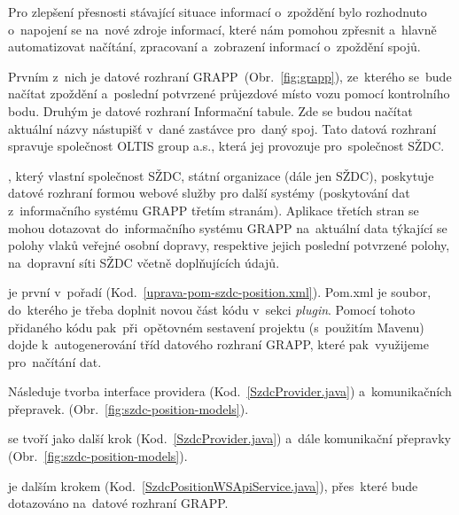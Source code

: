 
Pro zlepšení přesnosti stávající situace informací o~zpoždění bylo rozhodnuto o~napojení se na~nové zdroje informací, které nám pomohou zpřesnit a~hlavně automatizovat načítání, zpracovaní a~zobrazení informací o~zpoždění spojů.

Prvním z~nich je datové rozhraní GRAPP~(Obr.~\ref{fig:grapp}), ze~kterého se~bude načítat zpoždění a~poslední potvrzené průjezdové místo vozu pomocí kontrolního bodu. Druhým je datové rozhraní Informační tabule. Zde se budou načítat aktuální názvy nástupišť v~dané zastávce pro~daný spoj. Tato datová rozhraní spravuje společnost OLTIS group a.s., která jej provozuje pro~společnost SŽDC.



, který vlastní společnost SŽDC, státní organizace (dále jen SŽDC), poskytuje datové rozhraní formou webové služby pro další systémy (poskytování dat z~informačního systému GRAPP třetím stranám). Aplikace třetích stran se mohou dotazovat do~informačního systému GRAPP na~aktuální data týkající se polohy vlaků veřejné osobní dopravy, respektive jejich poslední potvrzené polohy, na~dopravní síti SŽDC včetně doplňujících údajů.

je první v~pořadí (Kod.~\ref{uprava-pom-szdc-position.xml}). Pom.xml je soubor, do~kterého je třeba doplnit novou část kódu v~sekci \textit{plugin}. Pomocí tohoto přidaného kódu pak~při~opětovném sestavení projektu (s~použitím Mavenu) dojde k~autogenerování tříd datového rozhraní GRAPP, které pak~využijeme pro~načítání dat.

Následuje tvorba interface providera (Kod.~\ref{SzdcProvider.java}) a~komunikačních přepravek. (Obr.~\ref{fig:szdc-position-models}).

 se tvoří jako další krok (Kod.~\ref{SzdcProvider.java}) a~dále komunikační přepravky (Obr.~\ref{fig:szdc-position-models}).
 	

 je dalším krokem (Kod.~\ref{SzdcPositionWSApiService.java}), přes~které bude dotazováno na~datové rozhraní GRAPP.

